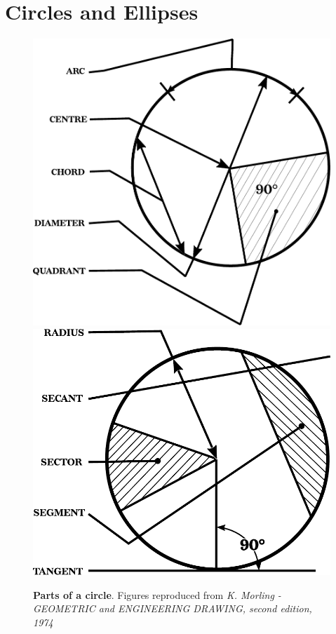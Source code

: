 \documentclass[12pt,openany,a4,usenames,dvipsnames]{book}
\begin{document}
\chapter{Circles and Ellipses}
\begin{figure}[H]
\centering
\includegraphics[scale=0.5,keepaspectratio]{figures/circle_parts.pdf}
\includegraphics[scale=0.5,keepaspectratio]{figures/circle_parts2.pdf}
  {\par\scriptsize{}\textbf{Parts of a circle}. Figures reproduced from \emph{K. Morling - GEOMETRIC and ENGINEERING DRAWING, second edition, 1974}}
\end{figure}
\end{document}

